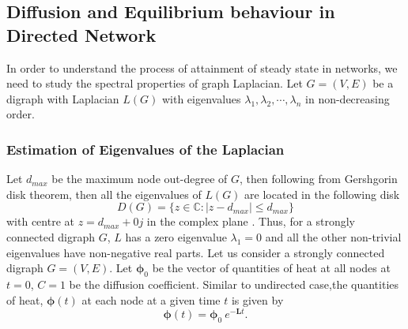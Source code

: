 \documentclass[10pt,a4paper]{article}
\begin{document}
        \subsection{Diffusion and Equilibrium behaviour in Directed Network}
        In order to understand the process of attainment of steady state in networks, we need to study the spectral properties of graph Laplacian. Let $G=(V,E)$ be a digraph with Laplacian $L(G)$ with eigenvalues $\lambda_1, \lambda_2, \cdots, \lambda_n$ in non-decreasing order. 
        \subsubsection{Estimation of Eigenvalues of the Laplacian}
        Let $d_{max}$ be the maximum node out-degree of $G$, then following from Gershgorin disk theorem, then all the eigenvalues of $L(G)$ are located in the following disk
        \begin{equation} 
        D(G) = \{ z \in \mathbb{C} : |z-d_{max}| \leq d_{max} \}
        \end{equation}
        with centre at $z = d_{max} +0j$ in the complex plane \citep{saber2003agreement}. Thus, for a strongly connected digraph $G$, $L$ has a zero eigenvalue $\lambda_1=0$ and all the other non-trivial eigenvalues have non-negative real parts.
        Let us consider a strongly connected digraph $G=(V,E)$. Let $\boldsymbol{\phi}_0$ be the vector of quantities of heat at all nodes at $t=0$, $C=1$ be the diffusion coefficient. Similar to undirected case,the quantities of heat, $\boldsymbol{\phi}(t)$ at each node at a given time $t$ is given by
        \begin{equation}
        \boldsymbol{\phi}(t) = \boldsymbol{\phi}_0~e^{-\mathbf{L}t}.
        \end{equation}
        
\end{document}
